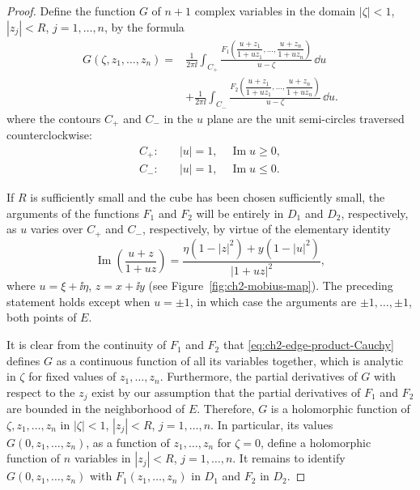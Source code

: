 \begin{proof}
Define the function $G$ of $n+1$ complex variables in the domain
$|\zeta|<1$, $|z_j|<R$, $j=1,\ldots,n$, by the formula
\begin{equation}
  \begin{aligned}
  G(\zeta,z_1,\ldots,z_n)
  ={}&\frac{1}{2\pi\ii}\int_{C_+}
  \frac{F_1\!\left(\dfrac{u+z_1}{1+uz_1},\ldots,
                  \dfrac{u+z_n}{1+uz_n}\right)}{u-\zeta}\,\dd u \\
  &+\frac{1}{2\pi\ii}\int_{C_-}
  \frac{F_2\!\left(\dfrac{u+z_1}{1+uz_1},\ldots,
                  \dfrac{u+z_n}{1+uz_n}\right)}{u-\zeta}\,\dd u.
  \end{aligned}
  \tag{2-100}\label{eq:ch2-edge-product-Cauchy}
\end{equation}
where the contours $C_+$ and $C_-$ in the $u$ plane are the unit semi-circles
traversed counterclockwise:
\begin{equation}
  \begin{aligned}
    C_+ :&\quad |u|=1,\quad \operatorname{Im}u\geq0,\\
    C_- :&\quad |u|=1,\quad \operatorname{Im}u\leq0.
  \end{aligned}
  \tag{2-101}\label{eq:ch2-edge-semicircles}
\end{equation}

If $R$ is sufficiently small and the cube has been chosen sufficiently small,
the arguments of the functions $F_1$ and $F_2$ will be entirely in $D_1$ and
$D_2$, respectively, as $u$ varies over $C_+$ and $C_-$, respectively, by
virtue of the elementary identity
\[
  \operatorname{Im}\left(\frac{u+z}{1+uz}\right)
  =\frac{\eta(1-|z|^2)+y(1-|u|^2)}{|1+uz|^2},
\]
where $u=\xi+\ii\eta$, $z=x+\ii y$ (see Figure~\ref{fig:ch2-mobius-map}).
The preceding statement holds except when $u=\pm1$, in which case the
arguments are $\pm1,\ldots,\pm1$, both points of $E$.

It is clear from the continuity of $F_1$ and $F_2$ that \eqref{eq:ch2-edge-product-Cauchy} defines $G$
as a continuous function of all its variables together, which is analytic in
$\zeta$ for fixed values of $z_1,\ldots,z_n$. Furthermore, the partial
derivatives of $G$ with respect to the $z_j$ exist by our assumption that the
partial derivatives of $F_1$ and $F_2$ are bounded in the neighborhood of $E$.
Therefore, $G$ is a holomorphic function of $\zeta,z_1,\ldots,z_n$ in
$|\zeta|<1$, $|z_j|<R$, $j=1,\ldots,n$. In particular, its values
$G(0,z_1,\ldots,z_n)$, as a function of $z_1,\ldots,z_n$ for $\zeta=0$,
define a holomorphic function of $n$ variables in $|z_j|<R$,
$j=1,\ldots,n$. It remains to identify $G(0,z_1,\ldots,z_n)$ with
$F_1(z_1,\ldots,z_n)$ in $D_1$ and $F_2$ in $D_2$.


\end{proof}
